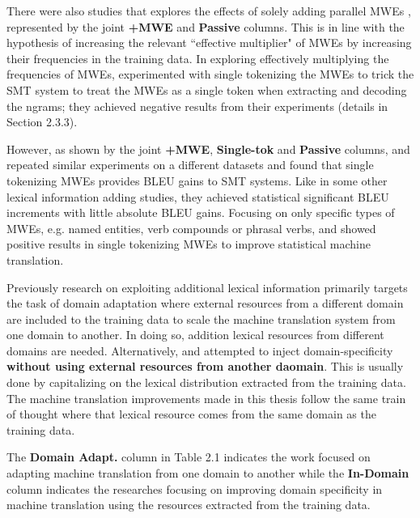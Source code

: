 There were also studies that explores the effects of solely adding parallel MWEs \citep{lambert2006grouping,pal2010handling,tsvetkov2012extraction,simova2013improving,kordoni2014multiword}, represented by the joint \textbf{+MWE} and \textbf{Passive} columns. This is in line with the \citep{brown1993dictionaries} hypothesis of increasing the relevant ``effective multiplier" of MWEs by increasing their frequencies in the training data. In exploring effectively multiplying the frequencies of MWEs, \cite{lambert2006grouping} experimented with single tokenizing the MWEs to trick the SMT system to treat the MWEs as a single token when extracting and decoding the ngrams; they achieved negative results from their experiments (details in Section 2.3.3). 

However, as shown by the joint \textbf{+MWE}, \textbf{Single-tok} and \textbf{Passive} columns, \cite{tsvetkov2012extraction} and \cite{kordoni2014multiword} repeated similar experiments on a different datasets and found that single tokenizing MWEs provides BLEU gains to SMT systems. Like in some other lexical information adding studies, they achieved statistical significant BLEU increments with little absolute BLEU gains. Focusing on only specific types of MWEs, e.g. named entities, verb compounds or phrasal verbs, \cite{pal2010handling} and \cite{simova2013improving} showed positive results in single tokenizing MWEs to improve statistical machine translation.

Previously research on exploiting additional lexical information primarily targets the task of domain adaptation where external resources from a different domain are included to the training data to scale the machine translation system from one domain to another. In doing so, addition lexical resources from different domains are needed. Alternatively, \cite{tsvetkov2012extraction} and \cite{kordoni2014multiword} attempted to inject domain-specificity \textbf{without using external resources from another daomain}. This is usually done by capitalizing on the lexical distribution extracted from the training data. The machine translation improvements made in this thesis follow the same train of thought where that lexical resource comes from the same domain as the training data. 

The \textbf{Domain Adapt.} column in Table 2.1 indicates the work focused on adapting machine translation from one domain to another while the \textbf{In-Domain} column indicates the researches focusing on improving domain specificity in machine translation using the resources extracted from the training data.


